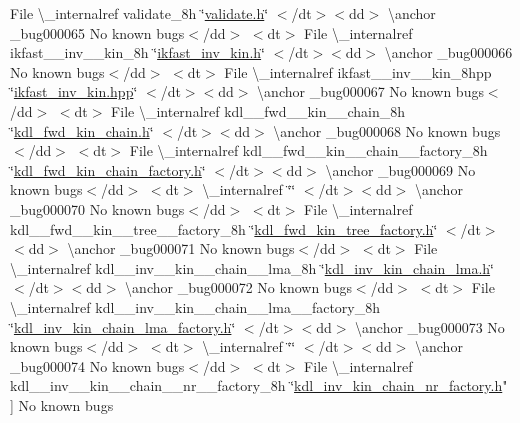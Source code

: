 \begin{DoxyRefList}
\+File \textbackslash{}\+\_\+internalref validate\+\_\+8h \char`\"{}\mbox{\hyperlink{validate_8h}{validate.\+h}}\char`\"{} $<$/dt$>$$<$dd$>$ \textbackslash{}anchor \+\_\+bug000065 No known bugs$<$/dd$>$ $<$dt$>$
\+File \textbackslash{}\+\_\+internalref ikfast\+\_\+\+\_\+inv\+\_\+\+\_\+kin\+\_\+8h \char`\"{}\mbox{\hyperlink{ikfast__inv__kin_8h}{ikfast\+\_\+inv\+\_\+kin.\+h}}\char`\"{} $<$/dt$>$$<$dd$>$ \textbackslash{}anchor \+\_\+bug000066 No known bugs$<$/dd$>$ $<$dt$>$
\+File \textbackslash{}\+\_\+internalref ikfast\+\_\+\+\_\+inv\+\_\+\+\_\+kin\+\_\+8hpp \char`\"{}\mbox{\hyperlink{ikfast__inv__kin_8hpp}{ikfast\+\_\+inv\+\_\+kin.\+hpp}}\char`\"{} $<$/dt$>$$<$dd$>$ \textbackslash{}anchor \+\_\+bug000067 No known bugs$<$/dd$>$ $<$dt$>$
\+File \textbackslash{}\+\_\+internalref kdl\+\_\+\+\_\+fwd\+\_\+\+\_\+kin\+\_\+\+\_\+chain\+\_\+8h \char`\"{}\mbox{\hyperlink{kdl__fwd__kin__chain_8h}{kdl\+\_\+fwd\+\_\+kin\+\_\+chain.\+h}}\char`\"{} $<$/dt$>$$<$dd$>$ \textbackslash{}anchor \+\_\+bug000068 No known bugs$<$/dd$>$ $<$dt$>$
\+File \textbackslash{}\+\_\+internalref kdl\+\_\+\+\_\+fwd\+\_\+\+\_\+kin\+\_\+\+\_\+chain\+\_\+\+\_\+factory\+\_\+8h \char`\"{}\mbox{\hyperlink{kdl__fwd__kin__chain__factory_8h}{kdl\+\_\+fwd\+\_\+kin\+\_\+chain\+\_\+factory.\+h}}\char`\"{} $<$/dt$>$$<$dd$>$ \textbackslash{}anchor \+\_\+bug000069 No known bugs$<$/dd$>$ $<$dt$>$
 \textbackslash{}\+\_\+internalref  \char`\"{}\char`\"{} $<$/dt$>$$<$dd$>$ \textbackslash{}anchor \+\_\+bug000070 No known bugs$<$/dd$>$ $<$dt$>$
\+File \textbackslash{}\+\_\+internalref kdl\+\_\+\+\_\+fwd\+\_\+\+\_\+kin\+\_\+\+\_\+tree\+\_\+\+\_\+factory\+\_\+8h \char`\"{}\mbox{\hyperlink{kdl__fwd__kin__tree__factory_8h}{kdl\+\_\+fwd\+\_\+kin\+\_\+tree\+\_\+factory.\+h}}\char`\"{} $<$/dt$>$$<$dd$>$ \textbackslash{}anchor \+\_\+bug000071 No known bugs$<$/dd$>$ $<$dt$>$
\+File \textbackslash{}\+\_\+internalref kdl\+\_\+\+\_\+inv\+\_\+\+\_\+kin\+\_\+\+\_\+chain\+\_\+\+\_\+lma\+\_\+8h \char`\"{}\mbox{\hyperlink{kdl__inv__kin__chain__lma_8h}{kdl\+\_\+inv\+\_\+kin\+\_\+chain\+\_\+lma.\+h}}\char`\"{} $<$/dt$>$$<$dd$>$ \textbackslash{}anchor \+\_\+bug000072 No known bugs$<$/dd$>$ $<$dt$>$
\+File \textbackslash{}\+\_\+internalref kdl\+\_\+\+\_\+inv\+\_\+\+\_\+kin\+\_\+\+\_\+chain\+\_\+\+\_\+lma\+\_\+\+\_\+factory\+\_\+8h \char`\"{}\mbox{\hyperlink{kdl__inv__kin__chain__lma__factory_8h}{kdl\+\_\+inv\+\_\+kin\+\_\+chain\+\_\+lma\+\_\+factory.\+h}}\char`\"{} $<$/dt$>$$<$dd$>$ \textbackslash{}anchor \+\_\+bug000073 No known bugs$<$/dd$>$ $<$dt$>$
 \textbackslash{}\+\_\+internalref  \char`\"{}\char`\"{} $<$/dt$>$$<$dd$>$ \textbackslash{}anchor \+\_\+bug000074 No known bugs$<$/dd$>$ $<$dt$>$
\+File \textbackslash{}\+\_\+internalref kdl\+\_\+\+\_\+inv\+\_\+\+\_\+kin\+\_\+\+\_\+chain\+\_\+\+\_\+nr\+\_\+\+\_\+factory\+\_\+8h \char`\"{}\mbox{\hyperlink{kdl__inv__kin__chain__nr__factory_8h}{kdl\+\_\+inv\+\_\+kin\+\_\+chain\+\_\+nr\+\_\+factory.\+h}}" ]\label{bug__bug000075}%
%
No known bugs
\end{DoxyRefList}